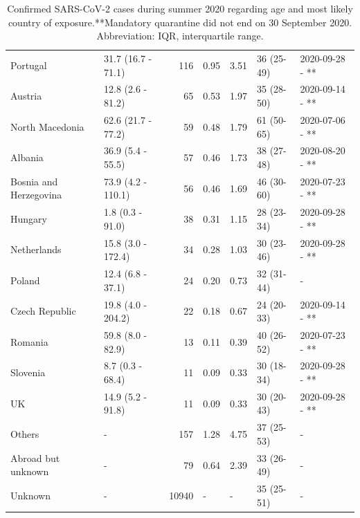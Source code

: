 \documentclass[10pt, a4paper, twoside]{article}
\begin{document}
\begin{table}
\begin{tabular}{llrllll}
  Portugal & 31.7 (16.7 - 71.1) & 116 & 0.95 & 3.51 & 36 (25-49) & 2020-09-28 - ** \\ 
  Austria & 12.8 (2.6 - 81.2) &  65 & 0.53 & 1.97 & 35 (28-50) & 2020-09-14 - ** \\ 
  North Macedonia & 62.6 (21.7 - 77.2) &  59 & 0.48 & 1.79 & 61 (50-65) & 2020-07-06 - ** \\ 
  Albania & 36.9 (5.4 - 55.5) &  57 & 0.46 & 1.73 & 38 (27-48) & 2020-08-20 - ** \\ 
  Bosnia and Herzegovina & 73.9 (4.2 - 110.1) &  56 & 0.46 & 1.69 & 46 (30-60) & 2020-07-23 - ** \\ 
  Hungary & 1.8 (0.3 - 91.0) &  38 & 0.31 & 1.15 & 28 (23-34) & 2020-09-28 - ** \\ 
  Netherlands & 15.8 (3.0 - 172.4) &  34 & 0.28 & 1.03 & 30 (23-46) & 2020-09-28 - ** \\ 
  Poland & 12.4 (6.8 - 37.1) &  24 & 0.20 & 0.73 & 32 (31-44) &  -  \\ 
  Czech Republic & 19.8 (4.0 - 204.2) &  22 & 0.18 & 0.67 & 24 (20-33) & 2020-09-14 - ** \\ 
  Romania & 59.8 (8.0 - 82.9) &  13 & 0.11 & 0.39 & 40 (26-52) & 2020-07-23 - ** \\ 
  Slovenia & 8.7 (0.3 - 68.4) &  11 & 0.09 & 0.33 & 30 (18-34) & 2020-09-28 - ** \\ 
  UK & 14.9 (5.2 - 91.8) &  11 & 0.09 & 0.33 & 30 (20-43) & 2020-09-28 - ** \\ 
  Others &  -  & 157 & 1.28 & 4.75 & 37 (25-53) &  -  \\ 
  Abroad but unknown &  -  &  79 & 0.64 & 2.39 & 33 (26-49) &  -  \\ 
  Unknown &  -  & 10940 &  -  &  -  & 35 (25-51) &  -  \\ 
   \hline
\end{tabular}
\endgroup
\caption{Confirmed SARS-CoV-2 cases during summer 2020 regarding age and most likely country of exposure.**Mandatory quarantine did not end on 30 September 2020. Abbreviation: IQR, interquartile range.} 
\label{t2}
\end{table}
\end{document}
